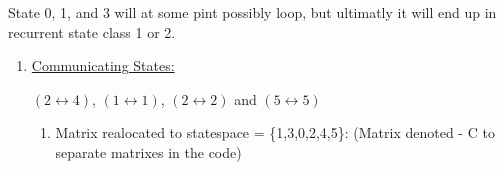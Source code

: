 \documentclass[]{article}
\providecommand{\tightlist}{%
  \setlength{\itemsep}{0pt}\setlength{\parskip}{0pt}}
\begin{document}
State 0, 1, and 3 will at some pint possibly loop, but ultimatly it will
end up in recurrent state class 1 or 2.

\begin{enumerate}
\def\labelenumi{\alph{enumi})}
\setcounter{enumi}{2}
\item
  \underline{Communicating States:}

  \((2\leftrightarrow{4})\), \((1\leftrightarrow{1})\),
  \((2\leftrightarrow{2})\) and \((5\leftrightarrow{5})\)

  \begin{enumerate}
  \def\labelenumii{\alph{enumii})}
  \setcounter{enumii}{3}
  \tightlist
  \item
    Matrix realocated to statespace = \{1,3,0,2,4,5\}: (Matrix denoted -
    C to separate matrixes in the code)
  \end{enumerate}
\end{enumerate}
\end{document}
